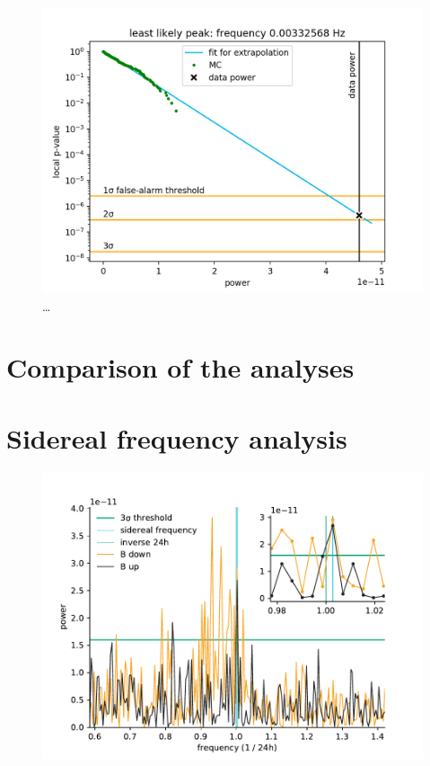 \begin{figure}
  \centering
  \includegraphics[width=\linewidth]{gfx/axions/E0_best_signal_candidate.png}
  \caption{\ldots}
  \label{fig:E0_best_signal_candidate}
\end{figure}



\chapter{Comparison of the analyses}


\chapter{Sidereal frequency analysis}
\begin{figure}
  \centering
  \includegraphics[width=0.8\linewidth]{gfx/axions/winddeltah4mm_sidereal.pdf}
  \caption{\cite{Romalis2009_NF}}\label{fig:axions_sidereal_detection}
\end{figure}


